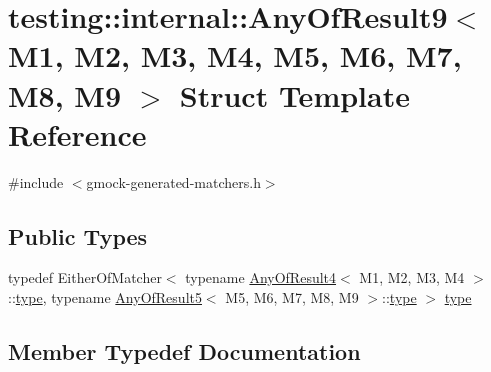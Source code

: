 \hypertarget{structtesting_1_1internal_1_1_any_of_result9}{}\section{testing\+::internal\+::Any\+Of\+Result9$<$ M1, M2, M3, M4, M5, M6, M7, M8, M9 $>$ Struct Template Reference}
\label{structtesting_1_1internal_1_1_any_of_result9}


{\ttfamily \#include $<$gmock-\/generated-\/matchers.\+h$>$}

\subsection*{Public Types}
\begin{DoxyCompactItemize}
\item 
typedef Either\+Of\+Matcher$<$ typename \mbox{\hyperlink{structtesting_1_1internal_1_1_any_of_result4}{Any\+Of\+Result4}}$<$ M1, M2, M3, M4 $>$\+::\mbox{\hyperlink{structtesting_1_1internal_1_1_any_of_result9_a308935fb02c62f502044dcc7b0a2b464}{type}}, typename \mbox{\hyperlink{structtesting_1_1internal_1_1_any_of_result5}{Any\+Of\+Result5}}$<$ M5, M6, M7, M8, M9 $>$\+::\mbox{\hyperlink{structtesting_1_1internal_1_1_any_of_result9_a308935fb02c62f502044dcc7b0a2b464}{type}} $>$ \mbox{\hyperlink{structtesting_1_1internal_1_1_any_of_result9_a308935fb02c62f502044dcc7b0a2b464}{type}}
\end{DoxyCompactItemize}


\subsection{Member Typedef Documentation}
\mbox{\label{structtesting_1_1internal_1_1_any_of_result9_a308935fb02c62f502044dcc7b0a2b464}} 
